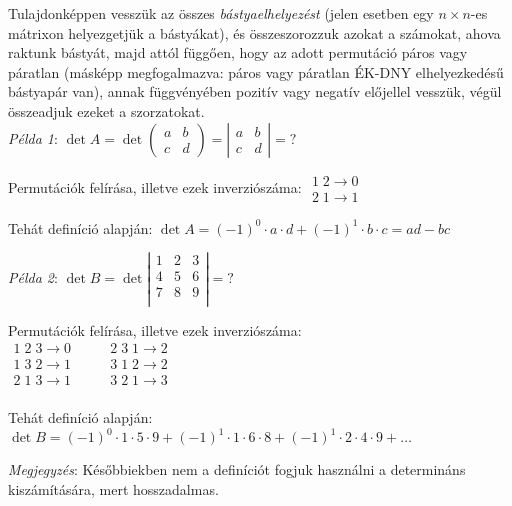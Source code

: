 \documentclass[a4paper,12pt,twoside]{book}
\theoremstyle{break}
\begin{document}
Tulajdonképpen vesszük az összes \textit{bástyaelhelyezést} (jelen esetben egy $n\times n$-es mátrixon helyezgetjük a bástyákat), és összeszorozzuk azokat a számokat, ahova raktunk bástyát, majd attól függően, hogy az adott permutáció páros vagy páratlan (másképp megfogalmazva: páros vagy páratlan ÉK-DNY elhelyezkedésű bástyapár van), annak függvényében pozitív vagy negatív előjellel vesszük, végül összeadjuk ezeket a szorzatokat.\\

\textit{Példa 1}: $\det A = \det \left(\begin{array}{cc}
a & b\\
c & d
\end{array} \right) = 
\left|\begin{array}{cc}
a & b\\
c & d
\end{array}\right|
= ?$\\
\begin{enumerate*}
 \item Permutációk felírása, illetve ezek inverziószáma: $
\begin{array}{l}
  1 \; 2 \rightarrow 0\\
  2 \; 1 \rightarrow 1
\end{array}$
 \item Tehát definíció alapján: $\det A = (-1)^0\cdot a\cdot d + (-1)^1\cdot b\cdot c = ad-bc$
\end{enumerate*}

\textit{Példa 2}: $\det B = \det \left|
\begin{array}{ccc}
1 & 2 & 3\\
4 & 5 & 6\\
7 & 8 & 9\\
\end{array}\right| = ?$
\begin{enumerate*}
 \item Permutációk felírása, illetve ezek inverziószáma:\\
$\begin{array}{l|l}
  1 \; 2 \; 3 \rightarrow 0 \quad&\quad 2 \; 3 \; 1 \rightarrow 2\\
  1 \; 3 \; 2 \rightarrow 1 \quad&\quad 3 \; 1 \; 2 \rightarrow 2\\
  2 \; 1 \; 3 \rightarrow 1 \quad&\quad 3 \; 2 \; 1 \rightarrow 3\\
\end{array}$
 \item Tehát definíció alapján: $\det B = (-1)^0\cdot 1\cdot 5\cdot 9 + (-1)^1\cdot 1\cdot 6\cdot 8 + (-1)^1\cdot 2\cdot 4\cdot 9 + \ldots$
\end{enumerate*}
\textit{Megjegyzés}: Későbbiekben nem a definíciót fogjuk használni a determináns kiszámítására, mert hosszadalmas.
\end{document}
